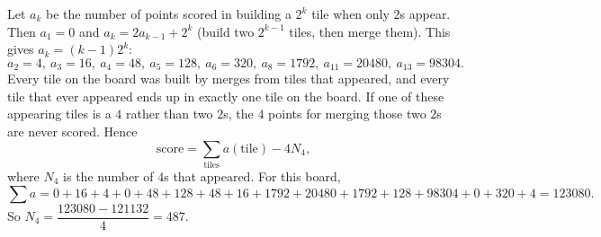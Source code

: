 Let $a_k$ be the number of points scored in building a $2^k$ tile when only $2$s appear. Then $a_1=0$ and $a_k=2a_{k-1}+2^k$ (build two $2^{k-1}$ tiles, then merge them). This gives $a_k=(k-1)2^k$:
\[a_2=4,\ a_3=16,\ a_4=48,\ a_5=128,\ a_6=320,\ a_8=1792,\ a_{11}=20480,\ a_{13}=98304.\]
Every tile on the board was built by merges from tiles that appeared, and every tile that ever appeared ends up in exactly one tile on the board. If one of these appearing tiles is a $4$ rather than two $2$s, the $4$ points for merging those two $2$s are never scored. Hence
\[\text{score}=\sum_{\text{tiles}}a(\text{tile})-4N_4,\]
where $N_4$ is the number of $4$s that appeared. For this board,
\[\sum a=0+16+4+0+48+128+48+16+1792+20480+1792+128+98304+0+320+4=123080.\]
So $N_4=\dfrac{123080-121132}{4}=\boxed{487}$.

